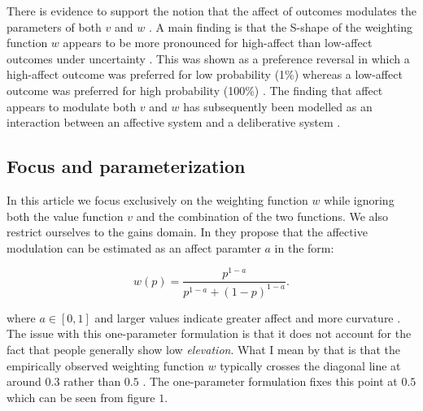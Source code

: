 \documentclass[12pt]{article}
\begin{document}
There is evidence to support
the notion that the affect of outcomes modulates
the parameters of both $v$
\autocite{hsee2004music} and $w$ \autocite{
rottenstreich2001money}. A main finding is
that the S-shape of the weighting function
$w$ appears to be more pronounced
for high-affect than low-affect outcomes under
uncertainty \autocite{rottenstreich2001money}.
This was shown as a preference reversal in
which a high-affect outcome was preferred for
low probability (1\%) whereas a low-affect
outcome was preferred for high probability (100\%)
\autocite{rottenstreich2001money}.
The finding that affect appears to modulate
both $v$ and $w$ has subsequently been
modelled as an interaction between an
affective system and a deliberative system \textcite{
	mukherjee2010dual,
mukherjee2011thinking}.

\subsection{Focus and parameterization}

In this article we focus exclusively on the
weighting function $w$ while ignoring both
the value function $v$ and the combination
of the two functions. We also restrict ourselves
to the gains domain.
In \textcite{rottenstreich2001money} they
propose that the affective modulation can
be estimated as an affect paramter $a$
in the form:

\[
	w(p) = \frac{p^{1-a}}
	{p^{1-a}+(1-p)^{1-a}}
.\]

where $a \in [0, 1]$ and larger values indicate
greater affect
and more curvature \autocite{rottenstreich2001money}.
The issue with this one-parameter
formulation is that it
does not account for the fact that people
generally show low \emph{elevation}.
What I mean by that is that the empirically
observed weighting function $w$ typically
crosses the diagonal line
at around $0.3$ rather than $0.5$
\autocite{gonzalez1999shape}. The one-parameter
formulation fixes this point at $0.5$
which can be seen from figure $1$.
\end{document}
